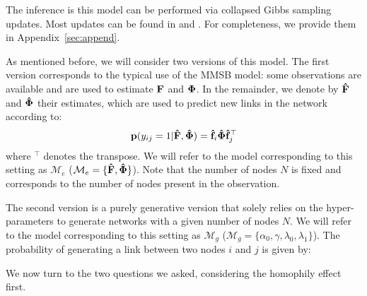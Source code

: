 The inference is this model can be performed via collapsed Gibbs sampling updates. Most updates can be found in \cite{HDP} and \cite{diMMSB}. For completeness, we provide them in Appendix~\ref{sec:append}.

As mentioned before, we will consider two versions of this model. The first version corresponds to the typical use of the MMSB model: some observations are available and are used to estimate $\mathbf{F}$ and $\mathbf{\Phi}$. In the remainder, we denote by $\mathbf{\hat{F}}$ and $\mathbf{\hat{\Phi}}$ their estimates, which are used to predict new links in the network according to:
%
\begin{equation}
\label{eq:link-me}
\mathbf{p}(y_{ij}=1|\mathbf{\hat{F}},\mathbf{\hat{\Phi}}) =  \mathbf{\hat{f}}_{i} \mathbf{\hat{\Phi}} \mathbf{\hat{f}}_j^\top
\end{equation}
%
where $^\top$ denotes the transpose. We will refer to the model corresponding to this setting as $\mathcal{M}_e$ ($\mathcal{M}_e = \{\mathbf{\hat{F}},\mathbf{\hat{\Phi}}\}$). Note that the number of nodes $N$ is fixed and corresponds to the number of nodes present in the observation.

The second version is a purely generative version that solely relies on the hyper-parameters to generate networks with a given number of nodes $N$. We will refer to the model corresponding to this setting as $\mathcal{M}_g$ ($\mathcal{M}_g = \{\alpha_0,\gamma,\lambda_0,\lambda_1\}$). The probability of generating a link between two nodes $i$ and $j$ is given by:
%


%
We now turn to the two questions we asked, considering the homophily effect first.